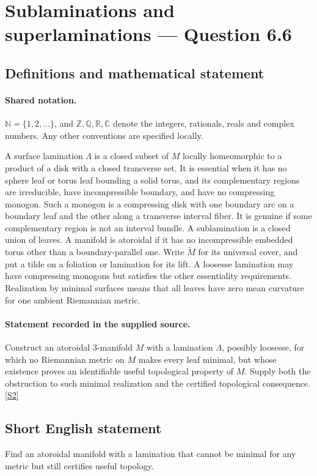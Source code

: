 \documentclass[11pt]{article}
\newcommand{\sref}[2]{\hyperlink{source:#1:#2}{[S#2]}}
\begin{document}
\section{Sublaminations and superlaminations — Question 6.6}\label{statement}

\subsection{Definitions and mathematical statement}

\paragraph{Shared notation.}$\mathbb N=\{1,2,\ldots\}$, and $\mathbb Z,\mathbb Q,\mathbb R,\mathbb C$ denote the integers, rationals, reals and complex numbers. Any other conventions are specified locally.


A surface lamination $\Lambda$ is a closed subset of $M$ locally homeomorphic to a product of a disk with a closed transverse set. It is essential when it has no sphere leaf or torus leaf bounding a solid torus, and its complementary regions are irreducible, have incompressible boundary, and have no compressing monogon. Such a monogon is a compressing disk with one boundary arc on a boundary leaf and the other along a transverse interval fiber. It is genuine if some complementary region is not an interval bundle. A sublamination is a closed union of leaves. A manifold is atoroidal if it has no incompressible embedded torus other than a boundary-parallel one. Write $\widetilde M$ for its universal cover, and put a tilde on a foliation or lamination for its lift. A loosesse lamination may have compressing monogons but satisfies the other essentiality requirements. Realization by minimal surfaces means that all leaves have zero mean curvature for one ambient Riemannian metric.
\paragraph{Statement recorded in the supplied source.}
Construct an atoroidal $3$-manifold $M$ with a lamination $\Lambda$, possibly loosesse, for which no Riemannian metric on $M$ makes every leaf minimal, but whose existence proves an identifiable useful topological property of $M$. Supply both the obstruction to such minimal realization and the certified topological consequence. \sref{statement}{2}
\subsection{Short English statement}
Find an atoroidal manifold with a lamination that cannot be minimal for any metric but still certifies useful topology.
\end{document}
